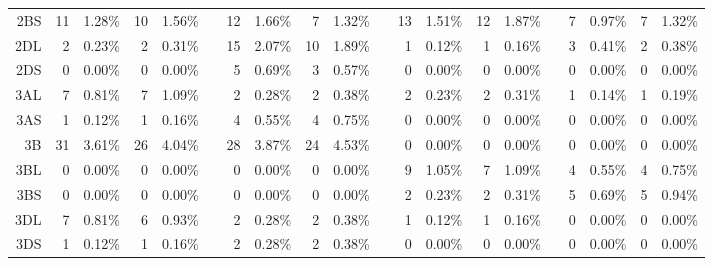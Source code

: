 \begin{sidewaystable}
\begin{localsize}{6}{9}
\begin{tabular}{rrrrrrrrrrrrrrrrrrrr}
 2BS            & 11                    & 1.28\%  & 10    & 1.56\%  &    & 12          & 1.66\%  & 7     & 1.32\%  &    & 13                     & 1.51\%  & 12    & 1.87\%  &    & 7           & 0.97\%  & 7     & 1.32\%  \\
 2DL            & 2                     & 0.23\%  & 2     & 0.31\%  &    & 15          & 2.07\%  & 10    & 1.89\%  &    & 1                      & 0.12\%  & 1     & 0.16\%  &    & 3           & 0.41\%  & 2     & 0.38\%  \\
 2DS            & 0                     & 0.00\%  & 0     & 0.00\%  &    & 5           & 0.69\%  & 3     & 0.57\%  &    & 0                      & 0.00\%  & 0     & 0.00\%  &    & 0           & 0.00\%  & 0     & 0.00\%  \\
  \midrule
  3AL            & 7                     & 0.81\%  & 7     & 1.09\%  &    & 2           & 0.28\%  & 2     & 0.38\%  &    & 2                      & 0.23\%  & 2     & 0.31\%  &    & 1           & 0.14\%  & 1     & 0.19\%  \\
 3AS            & 1                     & 0.12\%  & 1     & 0.16\%  &    & 4           & 0.55\%  & 4     & 0.75\%  &    & 0                      & 0.00\%  & 0     & 0.00\%  &    & 0           & 0.00\%  & 0     & 0.00\%  \\
 3B             & 31                    & 3.61\%  & 26    & 4.04\%  &    & 28          & 3.87\%  & 24    & 4.53\%  &    & 0                      & 0.00\%  & 0     & 0.00\%  &    & 0           & 0.00\%  & 0     & 0.00\%  \\
 3BL            & 0                     & 0.00\%  & 0     & 0.00\%  &    & 0           & 0.00\%  & 0     & 0.00\%  &    & 9                      & 1.05\%  & 7     & 1.09\%  &    & 4           & 0.55\%  & 4     & 0.75\%  \\
 3BS            & 0                     & 0.00\%  & 0     & 0.00\%  &    & 0           & 0.00\%  & 0     & 0.00\%  &    & 2                      & 0.23\%  & 2     & 0.31\%  &    & 5           & 0.69\%  & 5     & 0.94\%  \\
 3DL            & 7                     & 0.81\%  & 6     & 0.93\%  &    & 2           & 0.28\%  & 2     & 0.38\%  &    & 1                      & 0.12\%  & 1     & 0.16\%  &    & 0           & 0.00\%  & 0     & 0.00\%  \\
 3DS            & 1                     & 0.12\%  & 1     & 0.16\%  &    & 2           & 0.28\%  & 2     & 0.38\%  &    & 0                      & 0.00\%  & 0     & 0.00\%  &    & 0           & 0.00\%  & 0     & 0.00\%  \\

\end{tabular}
\end{localsize}
\end{sidewaystable}
